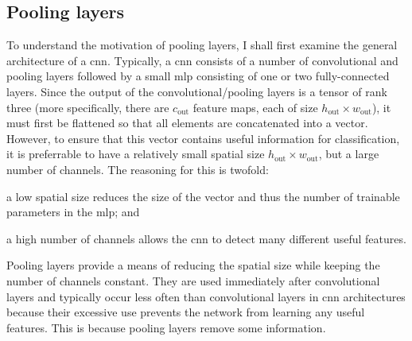 \documentclass[../report.tex]{subfiles}
\begin{document}
\subsection{Pooling layers}
To understand the motivation of pooling layers, I shall first examine the general architecture of a \gls{cnn}.
Typically, a \gls{cnn} consists of a number of convolutional and pooling layers followed by a small \gls{mlp} consisting of one or two fully-connected layers.
Since the output of the convolutional/pooling layers is a tensor of rank three (more specifically, there are $c_\text{out}$ feature maps, each of size $h_\text{out} \times w_\text{out}$), it must first be flattened so that all elements are concatenated into a vector.
However, to ensure that this vector contains useful information for classification, it is preferrable to have a relatively small spatial size $h_\text{out} \times w_\text{out}$, but a large number of channels. 
The reasoning for this is twofold:
\begin{enumerate*}[label=(\roman*)]
    \item a low spatial size reduces the size of the vector and thus the number of trainable parameters in the \gls{mlp}; and
    \item a high number of channels allows the \gls{cnn} to detect many different useful features. 
\end{enumerate*}
Pooling layers provide a means of reducing the spatial size while keeping the number of channels constant.
They are used immediately after convolutional layers and typically occur less often than convolutional layers in \gls{cnn} architectures because their excessive use prevents the network from learning any useful features.
This is because pooling layers remove some information.
\end{document}
